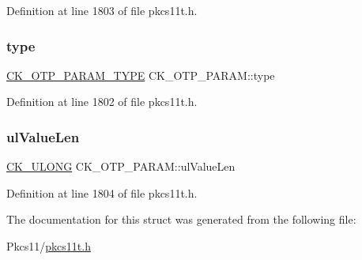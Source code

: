 Definition at line 1803 of file pkcs11t.\+h.

\mbox{\label{struct_c_k___o_t_p___p_a_r_a_m_a62fc02521f61dcfa046fd8118edc69dd}} 
\subsubsection{\texorpdfstring{type}{type}}
{\footnotesize\ttfamily \hyperlink{pkcs11t_8h_a62eef77156239dc17913d962b04ea14f}{C\+K\+\_\+\+O\+T\+P\+\_\+\+P\+A\+R\+A\+M\+\_\+\+T\+Y\+PE} C\+K\+\_\+\+O\+T\+P\+\_\+\+P\+A\+R\+A\+M\+::type}



Definition at line 1802 of file pkcs11t.\+h.

\mbox{\label{struct_c_k___o_t_p___p_a_r_a_m_a1cb40dfa8b0f26ca3f2eabc5297e513c}} 
\subsubsection{\texorpdfstring{ul\+Value\+Len}{ulValueLen}}
{\footnotesize\ttfamily \hyperlink{pkcs11t_8h_a35181858a3b7a0a81f49d180d8f446ef}{C\+K\+\_\+\+U\+L\+O\+NG} C\+K\+\_\+\+O\+T\+P\+\_\+\+P\+A\+R\+A\+M\+::ul\+Value\+Len}



Definition at line 1804 of file pkcs11t.\+h.



The documentation for this struct was generated from the following file\+:\begin{DoxyCompactItemize}
\item 
Pkcs11/\hyperlink{pkcs11t_8h}{pkcs11t.\+h}\end{DoxyCompactItemize}
